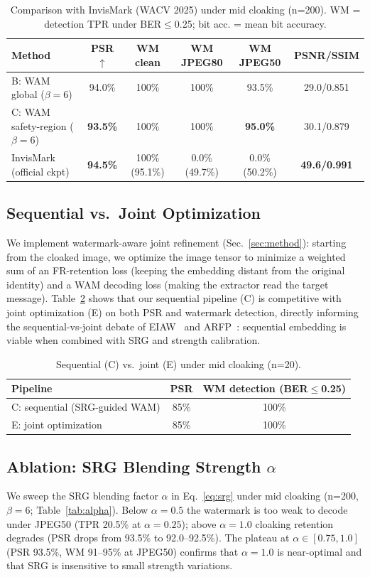 \documentclass[preprint,12pt]{elsarticle}
\begin{document}
\begin{table}[t]
\caption{Comparison with InvisMark (WACV 2025) under mid cloaking (n=200). WM = detection TPR under BER$\le$0.25; bit acc. = mean bit accuracy.}
\label{tab:baseline}
\centering
\small
\begin{tabular}{lccccc}
\toprule
Method & PSR$\uparrow$ & WM clean & WM JPEG80 & WM JPEG50 & PSNR/SSIM \\
\midrule
B: WAM global ($\beta{=}6$)  & 94.0\% & 100\% & 100\% & 93.5\% & 29.0/0.851 \\
C: WAM safety-region ($\beta{=}6$) & \textbf{93.5\%} & 100\% & 100\% & \textbf{95.0\%} & 30.1/0.879 \\
InvisMark (official ckpt) & \textbf{94.5\%} & 100\% (95.1\%) & 0.0\% (49.7\%) & 0.0\% (50.2\%) & \textbf{49.6/0.991} \\
\bottomrule
\end{tabular}
\end{table}
\subsection{Sequential vs.\ Joint Optimization}
\label{sec:joint}
We implement watermark-aware joint refinement (Sec.~\ref{sec:method}): starting from the cloaked image, we optimize the image tensor to minimize a weighted sum of an FR-retention loss (keeping the embedding distant from the original identity) and a WAM decoding loss (making the extractor read the target message). Table~\ref{tab:joint} shows that our sequential pipeline (C) is competitive with joint optimization (E) on both PSR and watermark detection, directly informing the sequential-vs-joint debate of EIAW~\cite{liu2026eiaw} and ARFP~\cite{zhang2026arfp}: sequential embedding is viable when combined with SRG and strength calibration.

\begin{table}[t]
\caption{Sequential (C) vs.\ joint (E) under mid cloaking (n=20).}
\label{tab:joint}
\centering
\small
\begin{tabular}{lcc}
\toprule
Pipeline & PSR & WM detection (BER$\le$0.25) \\
\midrule
C: sequential (SRG-guided WAM) & 85\% & 100\% \\
E: joint optimization          & 85\% & 100\% \\
\bottomrule
\end{tabular}
\end{table}

\subsection{Ablation: SRG Blending Strength $\alpha$}
\label{sec:alpha}
We sweep the SRG blending factor $\alpha$ in Eq.~\ref{eq:srg} under mid cloaking (n=200, $\beta{=}6$; Table~\ref{tab:alpha}). Below $\alpha=0.5$ the watermark is too weak to decode under JPEG50 (TPR 20.5\% at $\alpha{=}0.25$); above $\alpha=1.0$ cloaking retention degrades (PSR drops from 93.5\% to 92.0--92.5\%). The plateau at $\alpha\in[0.75,1.0]$ (PSR 93.5\%, WM 91--95\% at JPEG50) confirms that $\alpha{=}1.0$ is near-optimal and that SRG is insensitive to small strength variations.
\end{document}
